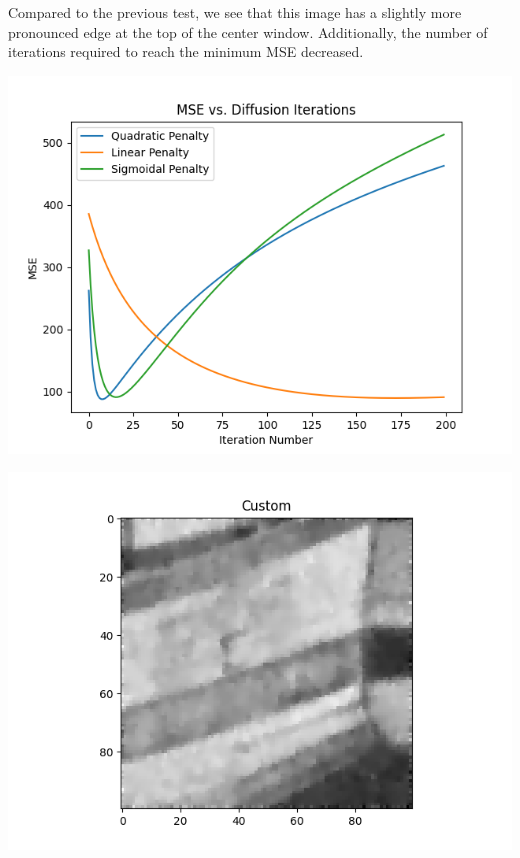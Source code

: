 \documentclass{article}
\begin{document}
  \noindent 
  Compared to the previous test, we see that this image has a slightly
  more pronounced edge at the top of the center window. Additionally,
  the number of iterations required to reach the minimum MSE decreased.
  \begin{center}
    \includegraphics[scale=0.5]{../generated_images/MSE_test2.png}\\
  \end{center}
  \begin{center}
    \includegraphics[scale=0.5]{../generated_images/Custom_test2.png}\\
  \end{center}
\end{document}

